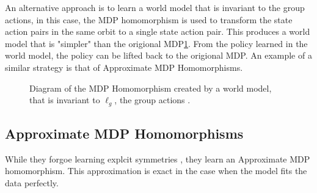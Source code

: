 An alternative approach is to learn a world model that is invariant to the group actions, in this case, the MDP homomorphism is used to transform the state action pairs in the same orbit to a single state action pair. This produces a world model that is "simpler" than the origional MDP\ref{fig:invariant_world_model}. From the policy learned in the world model, the policy can be lifted back to the origional MDP. An example of a similar strategy is that of Approximate MDP Homomorphisms.
\begin{figure}[h]
	\centering
	\caption{Diagram of the MDP Homomorphism created by a world model, that is invariant to $\ell_g$,  the group actions .}
	\label{fig:invariant_world_model}
\end{figure}
\subsection{Approximate MDP Homomorphisms}
While they forgoe learning explcit symmetries \cite{van2020plannable}, they learn an Approximate MDP homomorphism. This approximation is exact in the case when the model fits the data perfectly.

